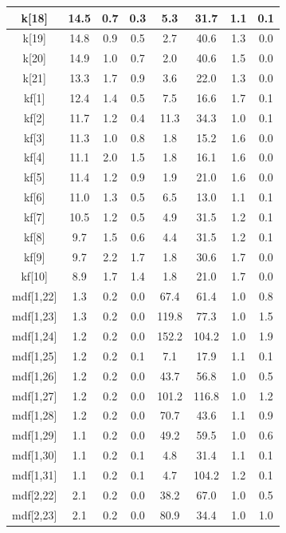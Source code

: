 \begin{longtable}{|c|c|c|c|c|c|c|c|}
\hline
k[18] & 14.5 & 0.7 & 0.3 & 5.3 & 31.7 & 1.1 & 0.1 \\
\hline
k[19] & 14.8 & 0.9 & 0.5 & 2.7 & 40.6 & 1.3 & 0.0 \\
\hline
k[20] & 14.9 & 1.0 & 0.7 & 2.0 & 40.6 & 1.5 & 0.0 \\
\hline
k[21] & 13.3 & 1.7 & 0.9 & 3.6 & 22.0 & 1.3 & 0.0 \\
\hline
kf[1] & 12.4 & 1.4 & 0.5 & 7.5 & 16.6 & 1.7 & 0.1 \\
\hline
kf[2] & 11.7 & 1.2 & 0.4 & 11.3 & 34.3 & 1.0 & 0.1 \\
\hline
kf[3] & 11.3 & 1.0 & 0.8 & 1.8 & 15.2 & 1.6 & 0.0 \\
\hline
kf[4] & 11.1 & 2.0 & 1.5 & 1.8 & 16.1 & 1.6 & 0.0 \\
\hline
kf[5] & 11.4 & 1.2 & 0.9 & 1.9 & 21.0 & 1.6 & 0.0 \\
\hline
kf[6] & 11.0 & 1.3 & 0.5 & 6.5 & 13.0 & 1.1 & 0.1 \\
\hline
kf[7] & 10.5 & 1.2 & 0.5 & 4.9 & 31.5 & 1.2 & 0.1 \\
\hline
kf[8] & 9.7 & 1.5 & 0.6 & 4.4 & 31.5 & 1.2 & 0.1 \\
\hline
kf[9] & 9.7 & 2.2 & 1.7 & 1.8 & 30.6 & 1.7 & 0.0 \\
\hline
kf[10] & 8.9 & 1.7 & 1.4 & 1.8 & 21.0 & 1.7 & 0.0 \\
\hline
mdf[1,22] & 1.3 & 0.2 & 0.0 & 67.4 & 61.4 & 1.0 & 0.8 \\
\hline
mdf[1,23] & 1.3 & 0.2 & 0.0 & 119.8 & 77.3 & 1.0 & 1.5 \\
\hline
mdf[1,24] & 1.2 & 0.2 & 0.0 & 152.2 & 104.2 & 1.0 & 1.9 \\
\hline
mdf[1,25] & 1.2 & 0.2 & 0.1 & 7.1 & 17.9 & 1.1 & 0.1 \\
\hline
mdf[1,26] & 1.2 & 0.2 & 0.0 & 43.7 & 56.8 & 1.0 & 0.5 \\
\hline
mdf[1,27] & 1.2 & 0.2 & 0.0 & 101.2 & 116.8 & 1.0 & 1.2 \\
\hline
mdf[1,28] & 1.2 & 0.2 & 0.0 & 70.7 & 43.6 & 1.1 & 0.9 \\
\hline
mdf[1,29] & 1.1 & 0.2 & 0.0 & 49.2 & 59.5 & 1.0 & 0.6 \\
\hline
mdf[1,30] & 1.1 & 0.2 & 0.1 & 4.8 & 31.4 & 1.1 & 0.1 \\
\hline
mdf[1,31] & 1.1 & 0.2 & 0.1 & 4.7 & 104.2 & 1.2 & 0.1 \\
\hline
mdf[2,22] & 2.1 & 0.2 & 0.0 & 38.2 & 67.0 & 1.0 & 0.5 \\
\hline
mdf[2,23] & 2.1 & 0.2 & 0.0 & 80.9 & 34.4 & 1.0 & 1.0 \\

\end{longtable}
